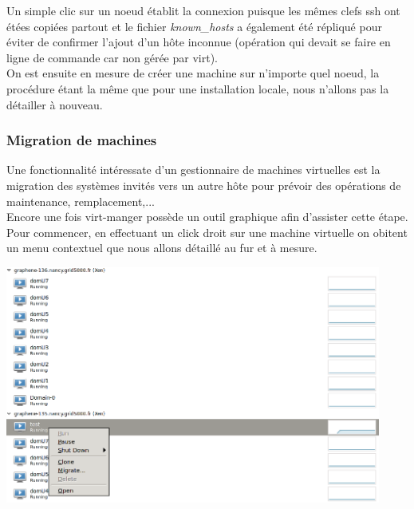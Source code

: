 Un simple clic sur un noeud établit la connexion puisque les mêmes clefs ssh ont étées copiées partout et le fichier \emph{known_hosts} a également été répliqué pour éviter de confirmer l'ajout d'un hôte inconnue (opération qui devait se faire en ligne de commande car non gérée par virt).
\\
On est ensuite en mesure de créer une machine sur n'importe quel noeud, la procédure étant la même que pour une installation locale, nous n'allons pas la détailler à nouveau.

\subsubsection{Migration de machines}
Une fonctionnalité intéressate d'un gestionnaire de machines virtuelles est la migration des systèmes invités vers un autre hôte pour prévoir des opérations de maintenance, remplacement,...\\
Encore une fois virt-manger possède un outil graphique afin d'assister cette étape. Pour commencer, en effectuant un click droit sur une machine virtuelle on obitent un menu contextuel que nous allons détaillé au fur et à mesure.
\begin{center}
  \includegraphics[width=350pt]{images/virt-menu-context.png}
\end{center}
